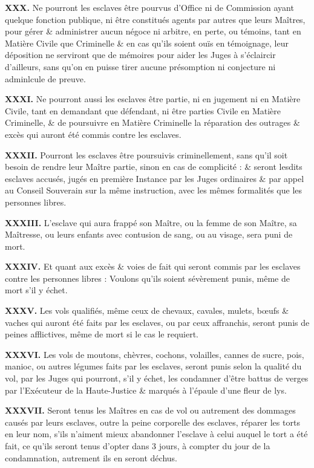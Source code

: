 \documentclass[french,twoside]{book} %
\newcommand{\labelchar}[1]{{\color{rubric}\bf #1}}
\begin{document}
\labelchar{XXX.} Ne pourront les esclaves être pourvus d’Office ni de Commission ayant quelque fonction publique, ni être constitués agents par autres que leurs Maîtres, pour gérer \& administrer aucun négoce ni arbitre, en perte, ou témoins, tant en Matière Civile que Criminelle \& en cas qu’ils soient ouïs en témoignage, leur déposition ne serviront que de mémoires pour aider les Juges à s’éclaircir d’ailleurs, sans qu’on en puisse tirer aucune présomption ni conjecture ni adminlcule de preuve.\par
\labelchar{XXXI.} Ne pourront aussi les esclaves être partie, ni en jugement ni en Matière Civile, tant en demandant que défendant, ni être parties Civile en Matière Criminelle, \& de poursuivre en Matière Criminelle la réparation des outrages \& excès qui auront été commis contre les esclaves.\par
\labelchar{XXXII.} Pourront les esclaves être poursuivis criminellement, sans qu’il soit besoin de rendre leur Maître partie, sinon en cas de complicité : \& seront lesdits esclaves accusés, jugés en première Instance par les Juges ordinaires \& par appel au Conseil Souverain sur la même instruction, avec les mêmes formalités que les personnes libres.\par
\labelchar{XXXIII.} L’esclave qui aura frappé son Maître, ou la femme de son Maître, sa Maîtresse, ou leurs enfants avec contusion de sang, ou au visage, sera puni de mort.\par
\labelchar{XXXIV.} Et quant aux excès \& voies de fait qui seront commis par les esclaves contre les personnes libres : Voulons qu’ils soient sévèrement punis, même de mort s’il y échet.\par
\labelchar{XXXV.} Les vols qualifiés, même ceux de chevaux, cavales, mulets, bœufs \& vaches qui auront été faits par les esclaves, ou par ceux affranchis, seront punis de peines afflictives, même de mort si le cas le requiert.\par
\labelchar{XXXVI.} Les vols de moutons, chèvres, cochons, volailles, cannes de sucre, pois, manioc, ou autres légumes faits par les esclaves, seront punis selon la qualité du vol, par les Juges qui pourront, s’il y échet, les condamner d’être battus de verges par l’Exécuteur de la Haute-Justice \& marqués à l’épaule d’une fleur de lys.\par
\labelchar{XXXVII.} Seront tenus les Maîtres en cas de vol ou autrement des dommages causés par leurs esclaves, outre la peine corporelle des esclaves, réparer les torts en leur nom, s’ils n’aiment mieux abandonner l’esclave à celui auquel le tort a été fait, ce qu’ils seront tenus d’opter dans 3 jours, à compter du jour de la condamnation, autrement ils en seront déchus.\par
\end{document}

